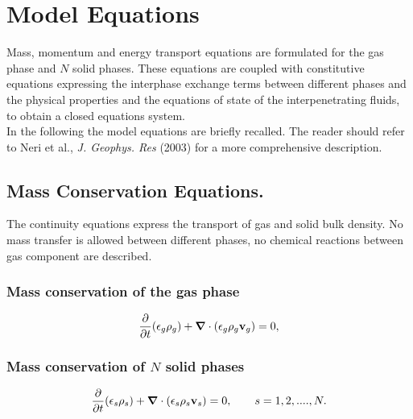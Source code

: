 \section{Model Equations}

Mass, momentum and energy transport equations are formulated for
the gas phase and $N$ solid phases. 
These equations are coupled with constitutive equations expressing
the interphase exchange terms between different phases and the
physical properties and the equations of state of the interpenetrating 
fluids, to obtain a closed equations system.\\
In the following the model equations are briefly recalled. The reader
should refer to Neri et al., {\it J. Geophys. Res} (2003) for a more
comprehensive description.

\subsection{Mass Conservation Equations.}
The continuity equations express the transport of gas and solid bulk
density. No mass transfer is allowed between different phases, no
chemical reactions between gas component are described. 

\subsubsection{\hspace{1cm}Mass conservation of the gas phase}

\begin{equation}
\frac{\partial}{\partial t}(\epsilon_{g}\rho_{g})+
\mbox{\boldmath $\nabla$}\cdot (\epsilon_{g}\rho_{g}{\bf v}_{g})=0,
\label{eq:gas_mass}
\end{equation}


\subsubsection{\hspace{1cm}Mass conservation of $N$ solid phases}

\begin{equation}
\frac{\partial}{\partial t}(\epsilon_{s}\rho_{s})+
\mbox{\boldmath $\nabla$}\cdot (\epsilon_{s}\rho_{s}{\bf v}_{s})=0,
\qquad s=1,2, ....,N.
\label{eq:solid_mass}
\end{equation}

